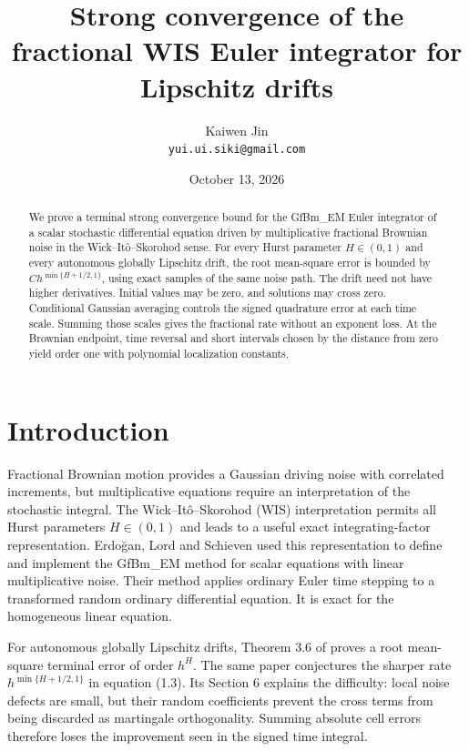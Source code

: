 \documentclass[11pt]{article}
\title{Strong convergence of the fractional WIS Euler integrator for Lipschitz drifts}
\author{Kaiwen Jin\\ \small\texttt{yui.ui.siki@gmail.com}}
\date{October 13, 2026}
\theoremstyle{remark}
\begin{document}
\maketitle

\begin{abstract}
We prove a terminal strong convergence bound for the GfBm\_EM Euler
integrator of a scalar stochastic differential equation driven by
multiplicative fractional Brownian noise in the Wick--It\^o--Skorohod
sense. For every Hurst parameter \(H\in(0,1)\) and every autonomous
globally Lipschitz drift, the root mean-square error is bounded by
\(C h^{\min\{H+1/2,1\}}\), using exact samples of the same noise path.
The drift need not have higher derivatives. Initial values may be zero,
and solutions may cross zero. Conditional Gaussian averaging controls the
signed quadrature error at each time scale. Summing those scales gives
the fractional rate without an exponent loss. At the Brownian
endpoint, time reversal and short intervals chosen by the distance
from zero yield order one with polynomial localization constants.
\end{abstract}

\section{Introduction}

Fractional Brownian motion provides a Gaussian driving noise with
correlated increments, but multiplicative equations require an
interpretation of the stochastic integral. The Wick--It\^o--Skorohod
(WIS) interpretation permits all Hurst parameters \(H\in(0,1)\) and
leads to a useful exact integrating-factor representation.
Erdo\u{g}an, Lord and Schieven \cite{ELS} used this representation to
define and implement the GfBm\_EM method for scalar equations with
linear multiplicative noise. Their method applies ordinary Euler
time stepping to a transformed random ordinary differential equation.
It is exact for the homogeneous linear equation.

For autonomous globally Lipschitz drifts, Theorem 3.6 of \cite{ELS}
proves a root mean-square terminal error of order \(h^H\).
The same paper conjectures the sharper rate
\(h^{\min\{H+1/2,1\}}\) in equation (1.3).
Its Section 6 explains the difficulty: local noise defects are small,
but their random coefficients prevent the cross terms from being
discarded as martingale orthogonality. Summing absolute cell errors
therefore loses the improvement seen in the signed time integral.
\end{document}

